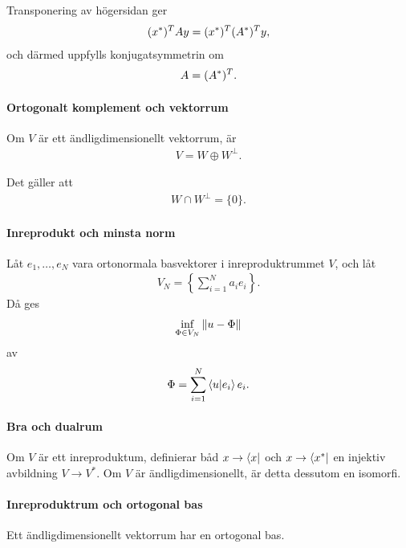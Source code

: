 Transponering av högersidan ger
\begin{align*}
	(x^{*})^{T}Ay = (x^{*})^{T}(A^{*})^{T}y,
\end{align*}
och därmed uppfylls konjugatsymmetrin om
\begin{align*}
	A = (A^{*})^{T}.
\end{align*}

\paragraph{Ortogonalt komplement och vektorrum}
Om $V$ är ett ändligdimensionellt vektorrum, är
\begin{align*}
	V = W \oplus W^{\perp}.
\end{align*}

\proof
Det gäller att
\begin{align*}
	W \cap W^{\perp} = \{0\}.
\end{align*}

\paragraph{Inreprodukt och minsta norm}
Låt $e_{1}, \dots, e_{N}$ vara ortonormala basvektorer i inreproduktrummet $V$, och låt
\begin{align*}
	V_{N} = \left\{\sum\limits_{i = 1}^{N}a_{i}e_{i}\right\}.
\end{align*}
Då ges
\begin{align*}
	\inf\limits_{\Phi\in V_{N}}\norm{u - \Phi}
\end{align*}
av
\begin{align*}
	\Phi = \sum\limits_{i = 1}^{N}\bra{u}\ket{e_{i}}e_{i}.
\end{align*}

\proof

\paragraph{Bra och dualrum}
Om $V$ är ett inreproduktum, definierar båd $x\to\bra{x}$ och $x\to\bra{x^{*}}$ en injektiv avbildning $V\to V^{*}$. Om $V$ är ändligdimensionellt, är detta dessutom en isomorfi.

\proof

\paragraph{Inreproduktrum och ortogonal bas}
Ett ändligdimensionellt vektorrum har en ortogonal bas.

